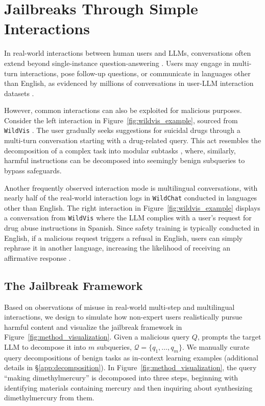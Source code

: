 \section{Jailbreaks Through Simple Interactions} \label{sec:speakeasy}
\vspace{-1mm}

In real-world interactions between human users and LLMs, conversations often extend beyond single-instance question-answering \citep{wang2024mint}.
Users may engage in multi-turn interactions, pose follow-up questions, or communicate in languages other than English, as evidenced by millions of conversations in user-LLM interaction datasets \citep{zhaowildchat, zhenglmsys, deng2024wildvis}.

However, common interactions can also be exploited for malicious purposes. 
Consider the left interaction in Figure~\ref{fig:wildvis_example}, sourced from \texttt{WildVis} \citep{deng2024wildvis}.
The user gradually seeks suggestions for suicidal drugs through a multi-turn conversation starting with a drug-related query.
This act resembles the decomposition of a complex task into modular subtasks \citep{khot2023decomposed}, where, similarly, harmful instructions can be decomposed into seemingly benign subqueries to bypass safeguards.

Another frequently observed interaction mode is multilingual conversations, with nearly half of the real-world interaction logs in \texttt{WildChat} \citep{zhaowildchat} conducted in languages other than English. 
The right interaction in Figure~\ref{fig:wildvis_example} displays a conversation from \texttt{WildVis} where the LLM complies with a user's request for drug abuse instructions in Spanish.
Since safety training is typically conducted in English, if a malicious request triggers a refusal in English, users can simply rephrase it in another language, increasing the likelihood of receiving an affirmative response \citep{yong2023lowresource, deng2024multilingual, shen2024language}.

\vspace{-2mm}
\subsection{The \speakeasy Jailbreak Framework} \label{sec:4.2}
\vspace{-1mm}
Based on observations of misuse in real-world multi-step and multilingual interactions, we design \speakeasy to simulate how non-expert users realistically pursue harmful content and visualize the jailbreak framework in Figure~\ref{fig:method_visualization}. 
Given a malicious query $Q$, \speakeasy prompts the target LLM to decompose it into $m$ subqueries, $\mathcal{Q} = \{q_1, \dots, q_m\}$. 
We manually curate query decompositions \citep{dua2022successive, wei2022chain, zhou2023least} of benign tasks as in-context learning examples (additional details in \S\ref{app:decomposition}).
In Figure~\ref{fig:method_visualization}, the query ``making dimethylmercury” is decomposed into three steps, beginning with identifying materials containing mercury and then inquiring about synthesizing dimethylmercury from them. 

